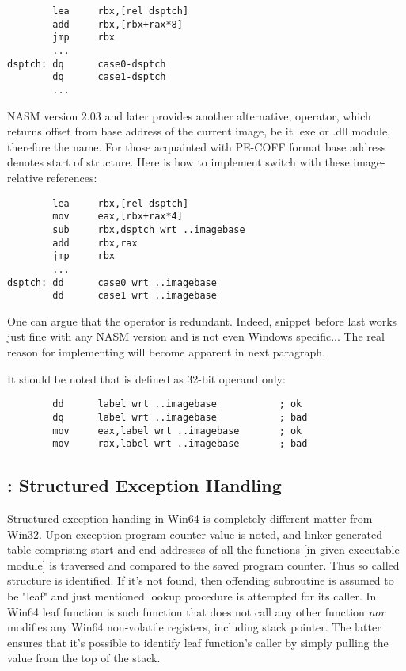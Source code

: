 \begin{lstlisting}
        lea     rbx,[rel dsptch]
        add     rbx,[rbx+rax*8]
        jmp     rbx
        ...
dsptch: dq      case0-dsptch
        dq      case1-dsptch
        ...
\end{lstlisting}

NASM version 2.03 and later provides another alternative,  operator, which returns offset from base address of the
current image, be it .exe or .dll module, therefore the name. For those
acquainted with PE-COFF format base address denotes start of
 structure. Here is how to implement switch with
these image-relative references:

\begin{lstlisting}
        lea     rbx,[rel dsptch]
        mov     eax,[rbx+rax*4]
        sub     rbx,dsptch wrt ..imagebase
        add     rbx,rax
        jmp     rbx
        ...
dsptch: dd      case0 wrt ..imagebase
        dd      case1 wrt ..imagebase
\end{lstlisting}

One can argue that the operator is redundant. Indeed, snippet before
last works just fine with any NASM version and is not even Windows
specific... The real reason for implementing  will
become apparent in next paragraph.

It should be noted that  is defined as 32-bit
operand only:

\begin{lstlisting}
        dd      label wrt ..imagebase           ; ok
        dq      label wrt ..imagebase           ; bad
        mov     eax,label wrt ..imagebase       ; ok
        mov     rax,label wrt ..imagebase       ; bad
\end{lstlisting}

\subsection{: Structured Exception Handling}
\label{subsec:win64seh}

Structured exception handing in Win64 is completely different matter
from Win32. Upon exception program counter value is noted, and
linker-generated table comprising start and end addresses of all the
functions [in given executable module] is traversed and compared to the
saved program counter. Thus so called  structure is
identified. If it's not found, then offending subroutine is assumed to
be "leaf" and just mentioned lookup procedure is attempted for its
caller. In Win64 leaf function is such function that does not call any
other function \emph{nor} modifies any Win64 non-volatile registers,
including stack pointer. The latter ensures that it's possible to
identify leaf function's caller by simply pulling the value from the
top of the stack.

